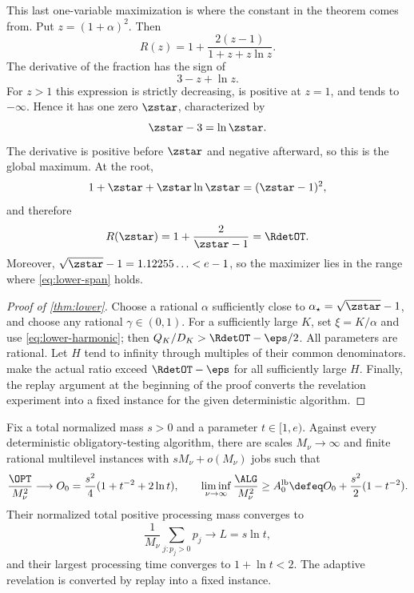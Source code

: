 This last one-variable maximization is where the constant in the theorem
comes from.  Put $z=(1+\alpha)^2$.  Then
\begin{equation}
  R(z)=1+\frac{2(z-1)}{1+z+z\ln z}.
  \label{eq:lower-Rz}
\end{equation}
The derivative of the fraction has the sign of
\[
  3-z+\ln z.
\]
For $z>1$ this expression is strictly decreasing, is positive at $z=1$, and
tends to $-\infty$.  Hence it has one zero $\zstar$, characterized by
\[
  \zstar-3=\ln \zstar.
\]
The derivative is positive before $\zstar$ and negative afterward, so this is
the global maximum.  At the root,
\[
  1+\zstar+\zstar\ln \zstar=(\zstar-1)^2,
\]
and therefore
\[
  R(\zstar)=1+\frac{2}{\zstar-1}=\RdetOT.
\]
Moreover, $\sqrt{\zstar}-1=1.12255\ldots<e-1$, so the maximizer lies in the
range where \cref{eq:lower-span} holds.

\begin{proof}[Proof of \cref{thm:lower}]
Choose a rational $\alpha$ sufficiently close to
$\alpha_\star=\sqrt{\zstar}-1$, and choose any rational
$\gamma\in(0,1)$.  For a sufficiently large $K$, set $\xi=K/\alpha$ and use
\cref{eq:lower-harmonic}; then $Q_K/D_K>\RdetOT-\eps/2$.
All parameters are rational.  Let $H$ tend to infinity through multiples of
their common denominators.   make the actual ratio exceed
$\RdetOT-\eps$ for all sufficiently large $H$.  Finally, the replay argument
at the beginning of the proof converts the revelation experiment into a fixed
instance for the given deterministic algorithm.
\end{proof}

\begin{lemma}
\label{lem:opt:harmonic-block}
Fix a total normalized mass $s>0$ and a parameter $t\in[1,e)$.  Against
every deterministic obligatory-testing algorithm, there are scales
$M_\nu\to\infty$ and finite rational multilevel instances with
$sM_\nu+o(M_\nu)$ jobs such that
\begin{equation}
 \frac{\OPT}{M_\nu^2}\longrightarrow
 O_0=\frac{s^2}{4}(1+t^{-2}+2\ln t),
 \qquad
 \liminf_{\nu\to\infty}\frac{\ALG}{M_\nu^2}
 \ge A_0^{\rm lb}
 \defeq O_0+\frac{s^2}{2}(1-t^{-2}).
 \label{eq:opt:harmonic-coefficients}
\end{equation}
Their normalized total positive processing mass converges to
\begin{equation}
 \frac1{M_\nu}\sum_{j:p_j>0}p_j\longrightarrow L=s\ln t,
 \label{eq:opt:harmonic-processing-mass}
\end{equation}
and their largest processing time converges to $1+\ln t<2$.
The adaptive revelation is converted by replay into a fixed instance.
\end{lemma}

